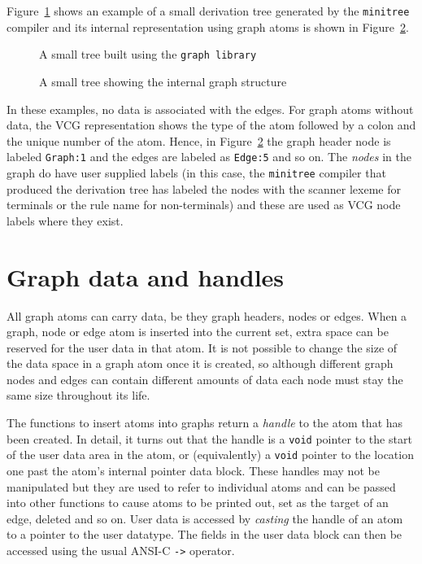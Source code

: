 Figure~\ref{graph:example:in} shows an example of a small derivation tree generated by the
{\tt minitree} compiler and its internal representation using graph atoms is shown in 
Figure~\ref{graph:example:out}.
\begin{figure}
\hspace*{5cm}
\begin{minipage}{10cm}
\end{minipage}
\caption{A small tree built using the {\tt graph library}}
\label{graph:example:in}
\end{figure}
\begin{figure}
\hspace*{3cm}
\begin{minipage}{10cm}
\end{minipage}
\caption{A small tree showing the internal graph structure}
\label{graph:example:out}
\end{figure}
In these examples, no data is associated with the edges. For graph atoms without data, the
VCG representation shows the type of the atom followed by a colon and the unique
number of the atom. Hence, in Figure~\ref{graph:example:out} the graph header node is
labeled {\tt Graph:1} and the edges are labeled as {\tt Edge:5} and so on. The {\em nodes} in the
graph do have user supplied labels (in this case, the {\tt minitree} compiler that produced the
derivation tree has labeled the nodes with the scanner lexeme for terminals or the rule name
for non-terminals) and these are used as VCG node labels where they exist.

\section{Graph data and handles}

All graph atoms can carry data, be they graph headers, nodes or edges.
When a graph, node or edge atom is inserted into the current set, extra
space can be reserved for the user data in that atom. It is not possible
to change the size of the data space in a graph atom once it is created, so although
different graph nodes and edges can contain different amounts of data
each node must stay the same size throughout its life. 

The functions to insert atoms into graphs return a {\em handle} to the
atom that has been created. In detail, it turns out that the handle is a
{\tt void} pointer  to the start of the user data area in the atom, or
(equivalently) a {\tt void} pointer to the location one past the atom's
internal pointer data block. These handles may not be manipulated but
they are used to refer to individual atoms and can be passed into other
functions to cause atoms to be printed out, set as the target of an
edge, deleted and so on.
User data is accessed by {\em casting} the handle of an atom to a pointer
to the user datatype. The fields in the user data block can then be accessed using the
usual ANSI-C {\tt ->} operator.

